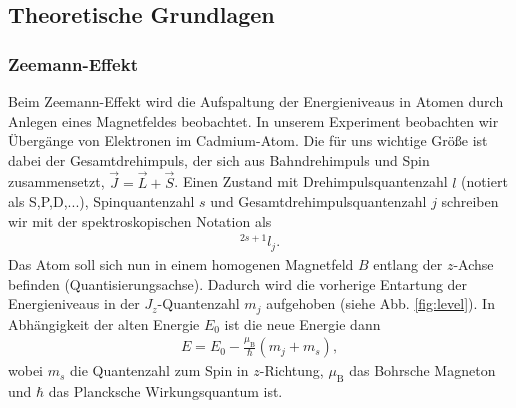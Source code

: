 \subsection{Theoretische Grundlagen}
\subsubsection{Zeemann-Effekt}
Beim Zeemann-Effekt wird die Aufspaltung der Energieniveaus in Atomen durch Anlegen eines Magnetfeldes beobachtet. In unserem Experiment beobachten wir Übergänge von Elektronen im Cadmium-Atom. Die für uns wichtige Größe ist dabei der Gesamtdrehimpuls, der sich aus Bahndrehimpuls und Spin zusammensetzt, $\vec{J}=\vec{L}+\vec{S}$. Einen Zustand mit Drehimpulsquantenzahl $l$ (notiert als S,P,D,...), Spinquantenzahl $s$ und Gesamtdrehimpulsquantenzahl $j$ schreiben wir mit der spektroskopischen Notation als
\begin{align*}
  ^{2s+1}l_j.
\end{align*}
Das Atom soll sich nun in einem homogenen Magnetfeld $B$ entlang der $z$-Achse befinden (Quantisierungsachse). Dadurch wird die vorherige Entartung der Energieniveaus in der $J_z$-Quantenzahl $m_j$ aufgehoben (siehe Abb. \ref{fig:level}). In Abhängigkeit der alten Energie $E_0$ ist die neue Energie dann \cite{shankar}
\begin{align*}
  E=E_0-\frac{\mu_\mathrm{B}}{\hbar}\left( m_j+m_s\right),
\end{align*}
wobei $m_s$ die Quantenzahl zum Spin in $z$-Richtung, $\mu_\mathrm{B}$ das Bohrsche Magneton und $\hbar$ das Plancksche Wirkungsquantum ist.

